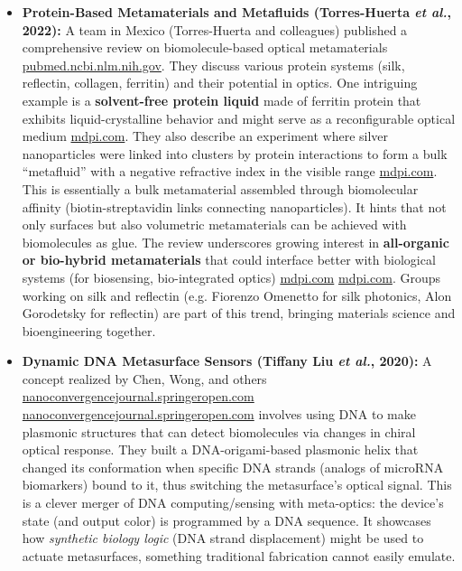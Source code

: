 \documentclass[11pt,a4paper]{article}
\begin{document}
\begin{itemize}
  \item \textbf{Protein-Based Metamaterials and Metafluids (Torres-Huerta \emph{et al.}, 2022):} A team in Mexico (Torres-Huerta and colleagues) published a comprehensive review on biomolecule-based optical metamaterials \href{https://pubmed.ncbi.nlm.nih.gov/36354471/#:~:text=Biomolecule,3390%2Fbios12110962}{pubmed.ncbi.nlm.nih.gov}. They discuss various protein systems (silk, reflectin, collagen, ferritin) and their potential in optics. One intriguing example is a \textbf{solvent-free protein liquid} made of ferritin protein that exhibits liquid-crystalline behavior and might serve as a reconfigurable optical medium \href{https://www.mdpi.com/2079-6374/12/11/962#:~:text=of proteins ,component%2C stoichiometric conjugate by}{mdpi.com}. They also describe an experiment where silver nanoparticles were linked into clusters by protein interactions to form a bulk ``metafluid'' with a negative refractive index in the visible range \href{https://www.mdpi.com/2079-6374/12/11/962#:~:text=metafluid on gram,high ionic strength buffer with}{mdpi.com}. This is essentially a bulk metamaterial assembled through biomolecular affinity (biotin-streptavidin links connecting nanoparticles). It hints that not only surfaces but also volumetric metamaterials can be achieved with biomolecules as glue. The review underscores growing interest in \textbf{all-organic or bio-hybrid metamaterials} that could interface better with biological systems (for biosensing, bio-integrated optics) \href{https://www.mdpi.com/2079-6374/12/11/962#:~:text=diversify their optical properties%2C dielectric,a number of fascinating smart}{mdpi.com} \href{https://www.mdpi.com/2079-6374/12/11/962#:~:text=surfaces%2C where on,92}{mdpi.com}. Groups working on silk and reflectin (e.g. Fiorenzo Omenetto for silk photonics, Alon Gorodetsky for reflectin) are part of this trend, bringing materials science and bioengineering together.
  \item \textbf{Dynamic DNA Metasurface Sensors (Tiffany Liu \emph{et al.}, 2020):} A concept realized by Chen, Wong, and others \href{https://nanoconvergencejournal.springeropen.com/articles/10.1186/s40580-020-00226-7#:~:text=metamaterials. A DNA,in handedness%2C color and intensity}{nanoconvergencejournal.springeropen.com} \href{https://nanoconvergencejournal.springeropen.com/articles/10.1186/s40580-020-00226-7#:~:text=The changes of DNA alignment,metamaterial%2C and the building block}{nanoconvergencejournal.springeropen.com} involves using DNA to make plasmonic structures that can detect biomolecules via changes in chiral optical response. They built a DNA-origami-based plasmonic helix that changed its conformation when specific DNA strands (analogs of microRNA biomarkers) bound to it, thus switching the metasurface's optical signal. This is a clever merger of DNA computing/sensing with meta-optics: the device's state (and output color) is programmed by a DNA sequence. It showcases how \emph{synthetic biology logic} (DNA strand displacement) might be used to actuate metasurfaces, something traditional fabrication cannot easily emulate.
\end{itemize}
\end{document}
